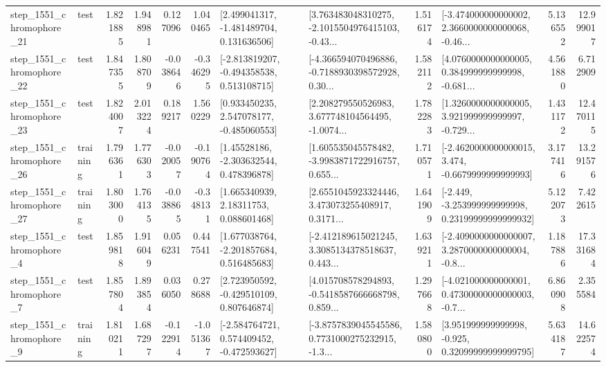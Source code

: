 \begin{tabular}{llrrrrllrlrr}
 step\_1551\_chromophore\_21 &      test &      1.821885 &    1.948981 &      0.127096 &  1.040465 &    [2.499041317, -1.481489704, 0.131636506] &  [3.763483048310275, -2.1015504976415103, -0.43... &       1.516174 &  [-3.474000000000002, 2.3660000000000068, -0.46... &            5.136552 &         12.999017 \\
 step\_1551\_chromophore\_22 &      test &      1.847355 &    1.808709 &     -0.038646 & -0.346295 &   [-2.813819207, -0.494358538, 0.513108715] &  [-4.366594070496886, -0.7188930398572928, 0.30... &       1.582112 &  [4.0760000000000005, 0.384999999999998, -0.681... &            4.561880 &          6.712909 \\
 step\_1551\_chromophore\_23 &      test &      1.824007 &    2.013224 &      0.189217 &  1.560229 &    [0.933450235, 2.547078177, -0.485060553] &  [2.208279550526983, 3.677748104564495, -1.0074... &       1.782283 &  [1.3260000000000005, 3.921999999999997, -0.729... &            1.431172 &         12.470115 \\
 step\_1551\_chromophore\_26 &  training &      1.796361 &    1.776303 &     -0.020057 & -0.190764 &     [1.45528186, -2.303632544, 0.478396878] &  [1.605535045578482, -3.9983871722916757, 0.655... &       1.710571 &  [-2.4620000000000015, 3.474, -0.6679999999999993] &            3.177416 &         13.291576 \\
 step\_1551\_chromophore\_27 &  training &      1.803000 &    1.764135 &     -0.038865 & -0.348131 &      [1.665340939, 2.18311753, 0.088601468] &  [2.6551045923324446, 3.473073255408917, 0.3171... &       1.641909 &  [-2.449, -3.253999999999998, 0.23199999999999932] &            5.122073 &          7.422615 \\
  step\_1551\_chromophore\_4 &      test &      1.859818 &    1.916049 &      0.056231 &  0.447541 &    [1.677038764, -2.201857684, 0.516485683] &  [-2.412189615021245, 3.3085134378518637, 0.443... &       1.639211 &  [-2.4090000000000007, 3.2870000000000004, -0.8... &            1.187886 &         17.331684 \\
  step\_1551\_chromophore\_7 &      test &      1.857804 &    1.893854 &      0.036050 &  0.278688 &    [2.723950592, -0.429510109, 0.807646874] &  [4.015708578294893, -0.5418587666668798, 0.859... &       1.297668 &  [-4.021000000000001, 0.47300000000000003, -0.7... &            6.860908 &          2.355584 \\
  step\_1551\_chromophore\_9 &  training &      1.810211 &    1.687297 &     -0.122914 & -1.051367 &   [-2.584764721, 0.574409452, -0.472593627] &  [-3.8757839045545586, 0.7731000275232915, -1.3... &       1.580800 &   [3.951999999999998, -0.925, 0.32099999999999795] &            5.634187 &         14.622574 \\

\end{tabular}
